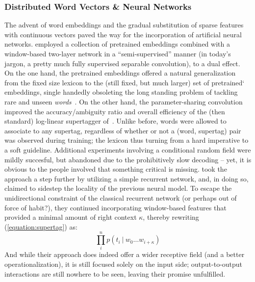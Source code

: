 \subsubsection{Distributed Word Vectors \& Neural Networks}
The advent of word embeddings and the gradual substitution of sparse features with continuous vectors paved the way for the incorporation of artificial neural networks.
\citet{10.1162/tacl_a_00186} employed a collection of pretrained embeddings combined with a window-based two-layer network in a ``semi-supervised'' manner (in today's jargon, a pretty much fully supervised separable convolution), to a dual effect.
On the one hand, the pretrained embeddings offered a natural generalization from the fixed size lexicon to the (still fixed, but much larger) set of pretrained` embeddings, single handedly obsoleting the long standing problem of tackling rare and unseen \textit{words}~\cite{thomforde-steedman-2011-semi,deoskar-etal-2011-learning,deoskar2014generalizing}.
On the other hand, the parameter-sharing convolution improved the accuracy/ambiguity ratio and overall efficiency of the (then standard) log-linear supertagger of~\citet{clark2007wide}.
Unlike before, words were allowed to associate to any supertag, regardless of whether or not a (word, supertag) pair was observed during training; the lexicon thus turning from a hard imperative to a soft guideline.
Additional experiments involving a conditional random field were mildly succesful, but abandoned due to the prohibitively slow decoding -- yet, it is obvious to the people involved that something critical is missing.
\citet{xu-etal-2015-ccg} took the approach a step further by utilizing a simple recurrent network, and, in doing so, claimed to sidestep the locality of the previous neural model.
To escape the unidirectional constraint of the classical recurrent network (or perhaps out of force of habit?), they continued incorporating window-based features that provided a minimal amount of right context $\kappa$, thereby rewriting (\ref{equation:supertag}) as:
\begin{equation}
	\prod_i^n p(t_i \ | \ w_0 \dots w_{i+\kappa})
\end{equation}
And while their approach does indeed offer a wider receptive field (and a better operationalization), it is still focused solely on the input side; output-to-output interactions are still nowhere to be seen, leaving their promise unfulfilled.

